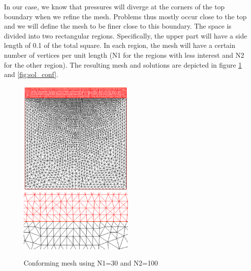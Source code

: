 \documentclass{article}
\begin{document}
In our case, we know that pressures will diverge at the corners of the top
boundary when we refine the mesh. Problems thus mostly occur close to the top
and we will define the mesh to be finer close to this boundary. The space is
divided into two rectangular regions. Specifically, the upper part will have a
side length of 0.1 of the total square. In each region, the mesh will have a
certain number of vertices per unit length (N1 for the regions with less
interest and N2 for the other region). The resulting mesh and solutions are
depicted in figure \ref{fig:mesh_conf} and \ref{fig:sol_conf}.
\begin{figure}[H] \label{fig:mesh_conf}
	\includegraphics[width=0.5\textwidth]{imgs/confroming_mesh_100_30.PNG}
	\includegraphics[width=0.5\textwidth]{imgs/conforming_mesh_intersection.PNG}
	\caption{Conforming mesh using
	N1=30 and N2=100}
\end{figure}
\end{document}
